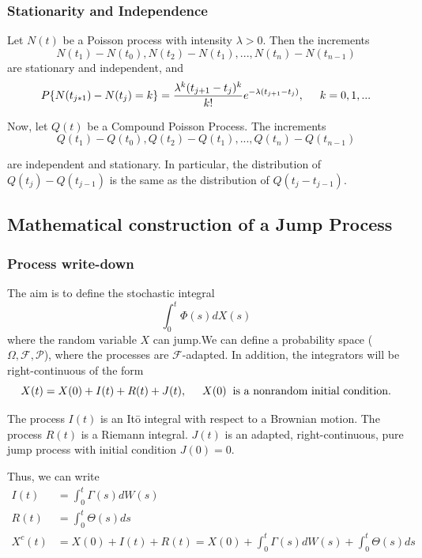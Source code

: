 \documentclass[paper=a4, fontsize=12pt]{scrartcl} %
\numberwithin{equation}{section}
\begin{document}
	\subsubsection{Stationarity and Independence}
	Let $N(t)$ be a Poisson process with intensity $\lambda > 0$. Then the increments
		\begin{equation}
			N(t_1) - N(t_0), N(t_2) - N(t_1), ..., N(t_n) - N(t_{n-1})
		\end{equation}
	are stationary and independent, and
		\begin{equation}
			P\{N(t_{j*1}) - N(t_j) = k\} = \frac{\lambda^k (t_{j+1} - t_j)^k}{k!} e^{-\lambda(t_{j+1} - t_j)}, \hspace {0.5cm} k=0,1,...
		\end{equation}
	
	Now, let $Q(t)$ be a Compound Poisson Process. The increments
		\begin{equation}
			Q(t_1) - Q(t_0), Q(t_2) - Q(t_1), ..., Q(t_n) - Q(t_{n-1})
		\end{equation}

	are independent and stationary. In particular, the distribution of $Q(t_j) - Q(t_{j-1})$ is the same as the distribution of $Q(t_j - t_{j-1})$.

\subsection{Mathematical construction of a Jump Process}
\subsubsection{Process write-down}
The aim is to define the stochastic integral
	\begin{equation}
		\int_0^t \Phi(s) dX(s)
	\end{equation}
where the random variable $X$ can jump.We can define a probability space ($\Omega, \mathcal{F}, \mathcal{P}$), where the processes are $\mathcal{F}$-adapted. In addition, the integrators will be right-continuous of the form
	\begin{equation}
		X(t) = X(0) + I(t) + R(t) + J(t), \hspace{0.5 cm} X(0) \hspace{0.2cm} \mbox{is a nonrandom initial condition}.
	\end{equation}
	
The process $I(t)$ is an It\={o} integral with respect to a Brownian motion. The process $R(t)$ is a Riemann integral. $J(t)$ is an adapted, right-continuous, pure jump process with initial condition $J(0) = 0$. \par
Thus, we can write
	\begin{equation}
	\begin{aligned}
		I(t) &= \int_0^t \Gamma(s) dW(s) \\
		R(t) &= \int_0^t \Theta(s) ds \\
		X^c(t) &= X(0) + I(t) + R(t) = X(0) + \int_0^t \Gamma(s) dW(s) + \int_0^t \Theta(s) ds
	\end{aligned}
	\end{equation}
	
\end{document}
